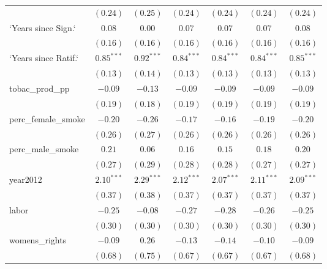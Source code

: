 \begin{table}[!h]
\begin{center}
\begin{tabular}{l c c c c c c }
                        & $(0.24)$     & $(0.25)$     & $(0.24)$     & $(0.24)$     & $(0.24)$     & $(0.24)$     \\
`Years since Sign.`     & $0.08$       & $0.00$       & $0.07$       & $0.07$       & $0.07$       & $0.08$       \\
                        & $(0.16)$     & $(0.16)$     & $(0.16)$     & $(0.16)$     & $(0.16)$     & $(0.16)$     \\
`Years since Ratif.`    & $0.85^{***}$ & $0.92^{***}$ & $0.84^{***}$ & $0.84^{***}$ & $0.84^{***}$ & $0.85^{***}$ \\
                        & $(0.13)$     & $(0.14)$     & $(0.13)$     & $(0.13)$     & $(0.13)$     & $(0.13)$     \\
tobac\_prod\_pp         & $-0.09$      & $-0.13$      & $-0.09$      & $-0.09$      & $-0.09$      & $-0.09$      \\
                        & $(0.19)$     & $(0.18)$     & $(0.19)$     & $(0.19)$     & $(0.19)$     & $(0.19)$     \\
perc\_female\_smoke     & $-0.20$      & $-0.26$      & $-0.17$      & $-0.16$      & $-0.19$      & $-0.20$      \\
                        & $(0.26)$     & $(0.27)$     & $(0.26)$     & $(0.26)$     & $(0.26)$     & $(0.26)$     \\
perc\_male\_smoke       & $0.21$       & $0.06$       & $0.16$       & $0.15$       & $0.18$       & $0.20$       \\
                        & $(0.27)$     & $(0.29)$     & $(0.28)$     & $(0.28)$     & $(0.27)$     & $(0.27)$     \\
year2012                & $2.10^{***}$ & $2.29^{***}$ & $2.12^{***}$ & $2.07^{***}$ & $2.11^{***}$ & $2.09^{***}$ \\
                        & $(0.37)$     & $(0.38)$     & $(0.37)$     & $(0.37)$     & $(0.37)$     & $(0.37)$     \\
labor                   & $-0.25$      & $-0.08$      & $-0.27$      & $-0.28$      & $-0.26$      & $-0.25$      \\
                        & $(0.30)$     & $(0.30)$     & $(0.30)$     & $(0.30)$     & $(0.30)$     & $(0.30)$     \\
womens\_rights          & $-0.09$      & $0.26$       & $-0.13$      & $-0.14$      & $-0.10$      & $-0.09$      \\
                        & $(0.68)$     & $(0.75)$     & $(0.67)$     & $(0.67)$     & $(0.67)$     & $(0.68)$     \\

\end{tabular}
\end{center}
\end{table}

